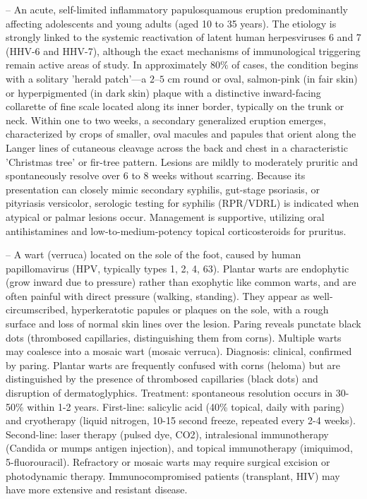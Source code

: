 -- An acute, self-limited inflammatory papulosquamous eruption predominantly affecting adolescents and young adults (aged 10 to 35 years). The etiology is strongly linked to the systemic reactivation of latent human herpesviruses 6 and 7 (HHV-6 and HHV-7), although the exact mechanisms of immunological triggering remain active areas of study. In approximately $80\%$ of cases, the condition begins with a solitary 'herald patch'---a $2\text{--}5\text{ cm}$ round or oval, salmon-pink (in fair skin) or hyperpigmented (in dark skin) plaque with a distinctive inward-facing collarette of fine scale located along its inner border, typically on the trunk or neck. Within one to two weeks, a secondary generalized eruption emerges, characterized by crops of smaller, oval macules and papules that orient along the Langer lines of cutaneous cleavage across the back and chest in a characteristic 'Christmas tree' or fir-tree pattern. Lesions are mildly to moderately pruritic and spontaneously resolve over 6 to 8 weeks without scarring. Because its presentation can closely mimic secondary syphilis, gut-stage psoriasis, or pityriasis versicolor, serologic testing for syphilis (RPR/VDRL) is indicated when atypical or palmar lesions occur. Management is supportive, utilizing oral antihistamines and low-to-medium-potency topical corticosteroids for pruritus.

-- A wart (verruca) located on the sole of the foot, caused by human papillomavirus (HPV, typically types 1, 2, 4, 63). Plantar warts are endophytic (grow inward due to pressure) rather than exophytic like common warts, and are often painful with direct pressure (walking, standing). They appear as well-circumscribed, hyperkeratotic papules or plaques on the sole, with a rough surface and loss of normal skin lines over the lesion. Paring reveals punctate black dots (thrombosed capillaries, distinguishing them from corns). Multiple warts may coalesce into a mosaic wart (mosaic verruca). Diagnosis: clinical, confirmed by paring. Plantar warts are frequently confused with corns (heloma) but are distinguished by the presence of thrombosed capillaries (black dots) and disruption of dermatoglyphics. Treatment: spontaneous resolution occurs in 30-50\% within 1-2 years. First-line: salicylic acid (40\% topical, daily with paring) and cryotherapy (liquid nitrogen, 10-15 second freeze, repeated every 2-4 weeks). Second-line: laser therapy (pulsed dye, CO2), intralesional immunotherapy (Candida or mumps antigen injection), and topical immunotherapy (imiquimod, 5-fluorouracil). Refractory or mosaic warts may require surgical excision or photodynamic therapy. Immunocompromised patients (transplant, HIV) may have more extensive and resistant disease.


